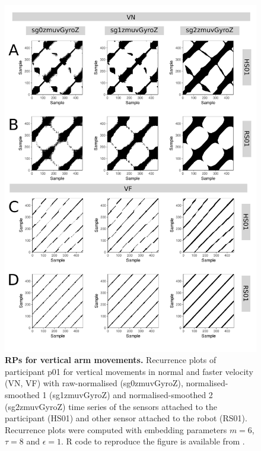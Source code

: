\begin{figure}[!h]
\centering
\includegraphics[height=0.85\textheight]{rp_aV}
\caption{
	{\bf RPs for vertical arm movements.}	
	Recurrence plots %
	of participant p01 for vertical movements in normal and faster 
	velocity (VN, VF) with raw-normalised (sg0zmuvGyroZ), 
	normalised-smoothed 1 (sg1zmuvGyroZ) and 
	normalised-smoothed 2 (sg2zmuvGyroZ) time series of the 
	sensors attached to the participant (HS01) and other sensor 
	attached to the robot (RS01).
	Recurrence plots were computed with 
	embedding parameters $m=6$, $\tau=8$ and $\epsilon=1$.
	R code to reproduce the figure is available from \cite{hwum2018}.
        }
    \label{fig:rp_aV}
\end{figure}






